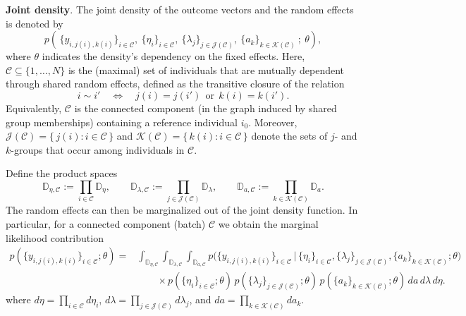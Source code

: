 \documentclass[12pt]{article}
\begin{document}
\textbf{Joint density}. 
The joint density of the outcome vectors and the random effects is denoted by
\[
p\!\left(\, \{y_{i,j(i),k(i)}\}_{i\in\mathcal{C}},\ \{\eta_i\}_{i\in\mathcal{C}},\ \{\lambda_j\}_{j\in\mathcal{J}(\mathcal{C})},\ \{a_k\}_{k\in\mathcal{K}(\mathcal{C})}\ ;\ \theta \right),
\]
where \(\theta\) indicates the density's dependency on the fixed effects.
Here, \(\mathcal{C}\subseteq\{1,\dots,N\}\) is the (maximal) set of individuals that are mutually dependent through shared random effects, defined as the transitive closure of the relation
\[
i \sim i' \quad \Longleftrightarrow \quad j(i)=j(i')\ \ \text{or}\ \ k(i)=k(i').
\]
Equivalently, \(\mathcal{C}\) is the connected component (in the graph induced by shared group memberships) containing a reference individual \(i_0\).
Moreover, \(\mathcal{J}(\mathcal{C})=\{\,j(i): i\in\mathcal{C}\,\}\) and
\(\mathcal{K}(\mathcal{C})=\{\,k(i): i\in\mathcal{C}\,\}\) denote the sets of \(j\)- and \(k\)-groups that occur among individuals in \(\mathcal{C}\).

Define the product spaces
\[
\mathbb{D}_{\eta,\mathcal{C}} := \prod_{i\in\mathcal{C}} \mathbb{D}_\eta,\qquad
\mathbb{D}_{\lambda,\mathcal{C}} := \prod_{j\in\mathcal{J}(\mathcal{C})} \mathbb{D}_\lambda,\qquad
\mathbb{D}_{a,\mathcal{C}} := \prod_{k\in\mathcal{K}(\mathcal{C})} \mathbb{D}_a.
\]
The random effects can then be marginalized out of the joint density function. In particular, for a connected component (batch) \(\mathcal{C}\) we obtain the marginal likelihood contribution
\[
\begin{aligned}
p\!\left(\{y_{i,j(i),k(i)}\}_{i\in\mathcal{C}};\theta\right)
=&
\int_{\mathbb{D}_{\eta,\mathcal{C}}}
\int_{\mathbb{D}_{\lambda,\mathcal{C}}}
\int_{\mathbb{D}_{a,\mathcal{C}}}
p\!\Big(
\{y_{i,j(i),k(i)}\}_{i\in\mathcal{C}}
\,\Big|\,
\{\eta_i\}_{i\in\mathcal{C}},
\{\lambda_j\}_{j\in\mathcal{J}(\mathcal{C})},
\{a_k\}_{k\in\mathcal{K}(\mathcal{C})};
\theta
\Big) \\
&\qquad\times
p\!\left(\{\eta_i\}_{i\in\mathcal{C}};\theta\right)
\,p\!\left(\{\lambda_j\}_{j\in\mathcal{J}(\mathcal{C})};\theta\right)
\,p\!\left(\{a_k\}_{k\in\mathcal{K}(\mathcal{C})};\theta\right)
\, da\, d\lambda\, d\eta .
\end{aligned}
\]
where \(d\eta=\prod_{i\in\mathcal{C}} d\eta_i\),
\(d\lambda=\prod_{j\in\mathcal{J}(\mathcal{C})} d\lambda_j\), and
\(da=\prod_{k\in\mathcal{K}(\mathcal{C})} da_k\).
\end{document}
